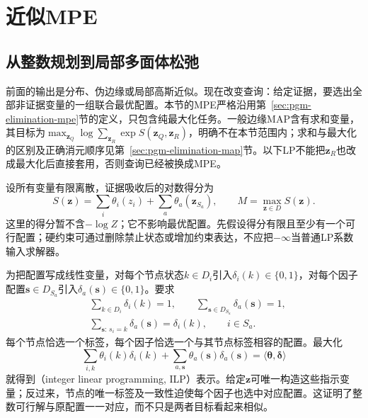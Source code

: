 \section{近似MPE}
\label{sec:pgm-variational-mpe}

\subsection{从整数规划到局部多面体松弛}
\label{sec:pgm-variational-ilp-local-polytope}
\label{sec:pgm-variational-lp}

前面的输出是分布、伪边缘或局部高斯近似。现在改变查询：给定证据，要选出全部非证据变量的一组联合最优配置。本节的MPE严格沿用第~\ref{sec:pgm-elimination-mpe}节的定义，只包含纯最大化任务。一般边缘MAP含有求和变量，其目标为$\max_{\bm z_Q}\log\sum_{\bm z_R}\exp S(\bm z_Q,\bm z_R)$，明确不在本节范围内；求和与最大化的区别及正确消元顺序见第~\ref{sec:pgm-elimination-map}节。以下LP不能把$\bm z_R$也改成最大化后直接套用，否则查询已经被换成MPE。

设所有变量有限离散，证据吸收后的对数得分为
\begin{equation}
  S(\bm z)=\sum_i\theta_i(z_i)
              +\sum_a\theta_a(\bm z_{S_a}),
  \qquad M=\max_{\bm z\in D}S(\bm z).
  \label{eq:pgm-variational-mpe-score}
\end{equation}
这里的得分暂不含$-\log Z$；它不影响最优配置。先假设得分有限且至少有一个可行配置；硬约束可通过删除禁止状态或增加约束表达，不应把$-\infty$当普通LP系数输入求解器。

为把配置写成线性变量，对每个节点状态$k\in D_i$引入$\delta_i(k)\in\{0,1\}$，对每个因子配置$\bm s\in D_{S_a}$引入$\delta_a(\bm s)\in\{0,1\}$。要求
\begin{equation}
  \begin{aligned}
    &\sum_{k\in D_i}\delta_i(k)=1,\qquad
       \sum_{\bm s\in D_{S_a}}\delta_a(\bm s)=1,\\
    &\sum_{\bm s:\,s_i=k}\delta_a(\bm s)=\delta_i(k),
        \qquad i\in S_a.
  \end{aligned}
  \label{eq:pgm-variational-ilp-constraints}
\end{equation}
每个节点恰选一个标签，每个因子恰选一个与其节点标签相容的配置。最大化
\[
  \sum_{i,k}\theta_i(k)\delta_i(k)
     +\sum_{a,\bm s}\theta_a(\bm s)\delta_a(\bm s)
     =\langle\bm{\theta},\bm{\delta}\rangle
\]
就得到（integer linear programming, ILP）表示。给定$\bm z$可唯一构造这些指示变量；反过来，节点的唯一标签及一致性迫使每个因子也选中对应配置。这证明了整数可行解与原配置一一对应，而不只是两者目标看起来相似。

